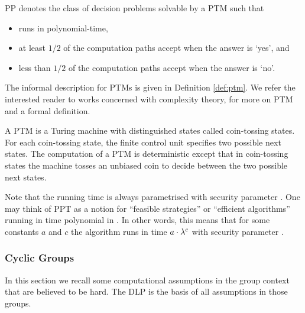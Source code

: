 \begin{definition}[\acl{PP}]\label{def:ppt}
\ac{PP} denotes the class of decision problems solvable by a \ac{PTM} \cA such that
\begin{itemize}
	\item \cA runs in polynomial-time,
	\item at least $1/2$ of the computation paths accept when the answer is `yes', and
	\item less than $1/2$ of the computation paths accept when the answer is `no'. \eod
\end{itemize}
\end{definition}

\noindent
The informal description for \aclp{PTM} is given in Definition \ref{def:ptm}.
We refer the interested reader to works concerned with complexity theory, \eg \cite{santos1969,WaterlooComplexity} for more on \ac{PTM} and a formal definition.

\begin{definition}\label{def:ptm}
A \ac{PTM} is a Turing machine with distinguished states called coin-tossing states.
For each coin-tossing state, the finite control unit specifies two possible next states.
The computation of a \ac{PTM} is deterministic except that in coin-tossing states the machine tosses an unbiased coin to decide between the two possible next states.
\end{definition}

\noindent
Note that the running time is always parametrised with security parameter \secpar.
One may think of \ac{PPT} as a notion for ``feasible strategies'' or ``efficient algorithms'' running in time polynomial in \secpar.
In other words, this means that for some constants $a$ and $c$ the algorithm runs in time $a\cdot \lambda^c$ with security parameter \secpar.

\subsubsection{Cyclic Groups}
In this section we recall some computational assumptions in the group context that are believed to be hard.
The \ac{DLP} is the basis of all assumptions in those groups.

